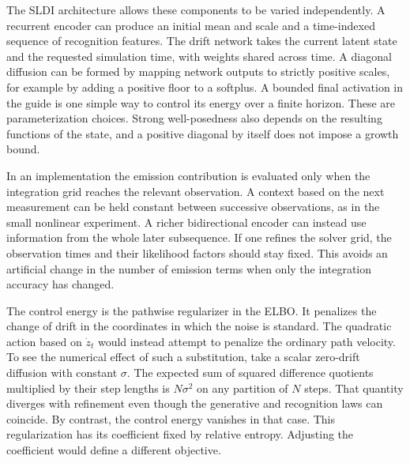 \documentclass[12pt]{article}
\begin{document}
The SLDI architecture allows these components to be varied independently. A recurrent encoder can produce an initial mean and scale and a time-indexed sequence of recognition features. The drift network takes the current latent state and the requested simulation time, with weights shared across time. A diagonal diffusion can be formed by mapping network outputs to strictly positive scales, for example by adding a positive floor to a softplus. A bounded final activation in the guide is one simple way to control its energy over a finite horizon. These are parameterization choices. Strong well-posedness also depends on the resulting functions of the state, and a positive diagonal by itself does not impose a growth bound.

In an implementation the emission contribution is evaluated only when the integration grid reaches the relevant observation. A context based on the next measurement can be held constant between successive observations, as in the small nonlinear experiment. A richer bidirectional encoder can instead use information from the whole later subsequence. If one refines the solver grid, the observation times and their likelihood factors should stay fixed. This avoids an artificial change in the number of emission terms when only the integration accuracy has changed.

The control energy is the pathwise regularizer in the ELBO. It penalizes the change of drift in the coordinates in which the noise is standard. The quadratic action based on \(\dot z_t\) would instead attempt to penalize the ordinary path velocity. To see the numerical effect of such a substitution, take a scalar zero-drift diffusion with constant \(\sigma\). The expected sum of squared difference quotients multiplied by their step lengths is \(N\sigma^2\) on any partition of \(N\) steps. That quantity diverges with refinement even though the generative and recognition laws can coincide. By contrast, the control energy vanishes in that case. This regularization has its coefficient fixed by relative entropy. Adjusting the coefficient would define a different objective.
\end{document}
